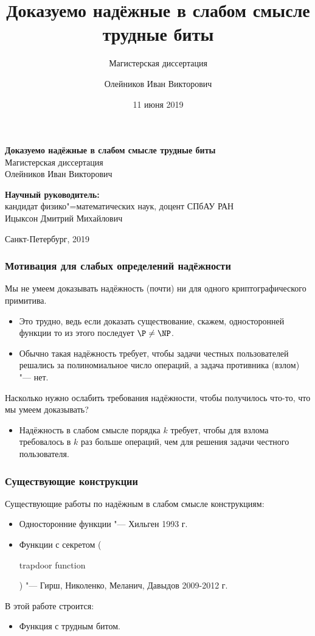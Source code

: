 \documentclass[mathserif,serif]{beamer} %
\title{Доказуемо надёжные в слабом смысле трудные биты}
\subtitle{Магистерская диссертация}
\author{Олейников Иван Викторович}
\date{11 июня 2019}
\theoremstyle{definition}
\theoremstyle{remark}
\begin{document}
\begin{frame}
\vspace{2cm}
\begin{center}
  \textbf{Доказуемо надёжные в слабом смысле трудные биты}
  \\
  Магистерская диссертация
  \\[1em]
  {
    Олейников Иван Викторович
  }
  \\[2em]
\end{center}

\hfill
\begin{minipage}{0.45\textwidth}
\textbf{Научный руководитель:} \\
кандидат физико"=математических наук, доцент СПбАУ РАН \\
Ицыксон Дмитрий Михайлович
\end{minipage}

\begin{center}
\mbox{}
\vfill
\small Санкт-Петербург, 2019
\end{center}
\end{frame}

\begin{frame}
  \frametitle{Мотивация для слабых определений надёжности}
  Мы не умеем доказывать надёжность (почти) ни для одного криптографического
  примитива.
  \begin{itemize}
  \item Это трудно, ведь если доказать существование, скажем, односторонней
  функции то из этого последует $\P \neq \NP$.
  \item Обычно такая надёжность требует, чтобы задачи честных пользователей
  решались за полиномиальное число операций, а задача противника (взлом) "---
  нет.
  \end{itemize}
  \pause
  Насколько нужно ослабить требования надёжности, чтобы получилось что-то, что
  мы умеем доказывать?
  \begin{itemize}
  \item Надёжность в слабом смысле порядка $k$ требует, чтобы для взлома
  требовалось в $k$ раз больше операций, чем для решения задачи честного
  пользователя.
  \end{itemize}
\end{frame}

\begin{frame}
  \frametitle{Существующие конструкции}
  Существующие работы по надёжным в слабом смысле конструкциям:
  \begin{itemize}
  \item Односторонние функции "--- Хильген 1993 г.
  \item Функции с секретом (\begin{english}trapdoor function\end{english}) "---
  Гирш, Николенко, Меланич, Давыдов 2009-2012 г.
  \end{itemize}
  \pause
  В этой работе строится:
  \begin{itemize}
  \item Функция с трудным битом.
  \end{itemize}
\end{frame}
\end{document}
